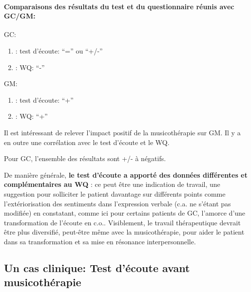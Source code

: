 \begin{enumerate}
  \paragraph{ Comparaisons des résultats du test et du questionnaire
    réunis avec GC/GM:}


  
  GC:
  \begin{enumerate}
 		\item : test d'écoute: ``='' ou ``+/-''
 		\item : WQ: ``-''
                  
            \end{enumerate}
GM:
  \begin{enumerate}
 		\item : test d'écoute: ``+''
 		\item : WQ: ``+''
                  
               \end{enumerate}

                Il est intéressant de relever l'impact positif de la
                musicothérapie sur GM.
                Il y a en outre une corrélation avec le test d'écoute et le
                WQ.

                
                Pour GC, l'ensemble des résultats sont +/- à négatifs.


                De manière générale,
                 \textbf{le test d'écoute a
                apporté des données différentes et complémentaires au
                WQ} : ce peut être une indication de travail, une
              suggestion pour
              solliciter le patient davantage sur différents points
              comme l'extériorisation des sentiments dans l'expression verbale
              (c.a. ne s'étant pas modifiée)
              en constatant, comme ici pour certains patients de GC,  
                l'amorce d'une transformation de l'écoute en
                c.o.. Visiblement, le travail
                thérapeutique devrait être plus diversifié, peut-être
                même avec la musicothérapie, pour aider le
                patient dans sa transformation
               et sa mise en résonance interpersonnelle.
                

     


\subsection{Un cas clinique: Test d'écoute avant musicothérapie}


\end{enumerate}
